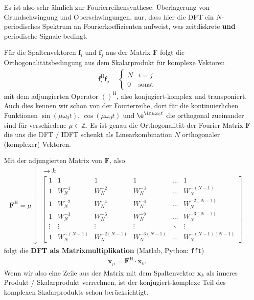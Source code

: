 Es ist also sehr ähnlich zur Fourierreihensynthese: Überlagerung von
Grundschwingung und Oberschwingungen, nur, dass hier die DFT ein $N$-periodisches
Spektrum an Fourierkoeffizienten aufweist, was zeitdiskrete \textbf{und}
periodische Signale bedingt.
%

Für die Spaltenvektoren $\bm{f}_i$ und $\bm{f}_j$ aus der Matrix $\bm{F}$
folgt die Orthogonalitätsbedingung aus dem Skalarprodukt für komplexe Vektoren
\begin{align}
\bm{f}_i^\mathrm{H} \bm{f}_j =
\begin{cases}
N & i=j\\
0 & \text{sonst}
\end{cases}
\end{align}
mit dem adjungierten Operator $()^\mathrm{H}$, also konjugiert-komplex und transponiert.
Auch dies kennen wir schon von der Fourierreihe, dort für die kontinuierlichen
Funktionen
$\sin(\mu \omega_0 t)$, $\cos(\mu \omega_0 t)$ und $\e^{\im \mu \omega_0 t}$ die
orthogonal zueinander sind für verschiedene $\mu\in\mathbb{Z}$.
%
Es ist genau die Orthogonalität der Fourier-Matrix $\bm{F}$ die uns die DFT / IDFT
schenkt als Linearkombination $N$ orthogonaler (komplexer) Vektoren.
%

Mit der adjungierten Matrix von $\bm{F}$, also
\begin{align}
\bm{F}^\mathrm{H} =
\mu \downarrow
\substack{\rightarrow k\\
\begin{bmatrix}
1 & 1 & 1 & 1 & \dots & 1\\[1em]
1 & W_N^{-1} & W_N^{-2} & W_N^{-3} & \dots & W_N^{-(N-1)}\\[1em]
1 & W_N^{-2} & W_N^{-4} & W_N^{-6} & \dots & W_N^{-2(N-1)}\\[1em]
1 & W_N^{-3} & W_N^{-6} & W_N^{-9} & \dots & W_N^{-3(N-1)}\\[1em]
\vdots & \vdots & \vdots &\vdots &\ddots & \vdots\\[1em]
1 & W_N^{-(N-1)} & W_N^{-2(N-1)} & W_N^{-3(N-1)} & \dots & W_N^{-(N-1)(N-1)}
\end{bmatrix}
}
\end{align}
folgt die \textbf{DFT als Matrixmultiplikation} (Matlab, Python: \texttt{fft})
\begin{align}
\bm{x}_\mu = \bm{F}^\mathrm{H} \cdot \bm{x}_k.
\end{align}
Wenn wir also eine Zeile aus der Matrix mit dem Spaltenvektor $\bm{x}_k$
als inneres Produkt / Skalarprodukt
verrechnen, ist der konjugiert-komplexe Teil des komplexen Skalarprodukts schon
berücksichtigt.

